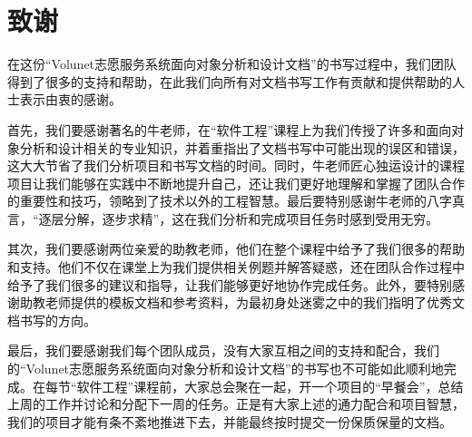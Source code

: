 

\section*{致\qquad 谢}

\hspace{8mm}

在这份“Volunet志愿服务系统面向对象分析和设计文档”的书写过程中，我们团队得到了很多的支持和帮助，在此我们向所有对文档书写工作有贡献和提供帮助的人士表示由衷的感谢。

首先，我们要感谢著名的牛老师，在“软件工程”课程上为我们传授了许多和面向对象分析和设计相关的专业知识，并着重指出了文档书写中可能出现的误区和错误，这大大节省了我们分析项目和书写文档的时间。同时，牛老师匠心独运设计的课程项目让我们能够在实践中不断地提升自己，还让我们更好地理解和掌握了团队合作的重要性和技巧，领略到了技术以外的工程智慧。最后要特别感谢牛老师的八字真言，“逐层分解，逐步求精”，这在我们分析和完成项目任务时感到受用无穷。

其次，我们要感谢两位亲爱的助教老师，他们在整个课程中给予了我们很多的帮助和支持。他们不仅在课堂上为我们提供相关例题并解答疑惑，还在团队合作过程中给予了我们很多的建议和指导，让我们能够更好地协作完成任务。此外，要特别感谢助教老师提供的模板文档和参考资料，为最初身处迷雾之中的我们指明了优秀文档书写的方向。

最后，我们要感谢我们每个团队成员，没有大家互相之间的支持和配合，我们的“Volunet志愿服务系统面向对象分析和设计文档”的书写也不可能如此顺利地完成。在每节“软件工程”课程前，大家总会聚在一起，开一个项目的“早餐会”，总结上周的工作并讨论和分配下一周的任务。正是有大家上述的通力配合和项目智慧，我们的项目才能有条不紊地推进下去，并能最终按时提交一份保质保量的文档。

